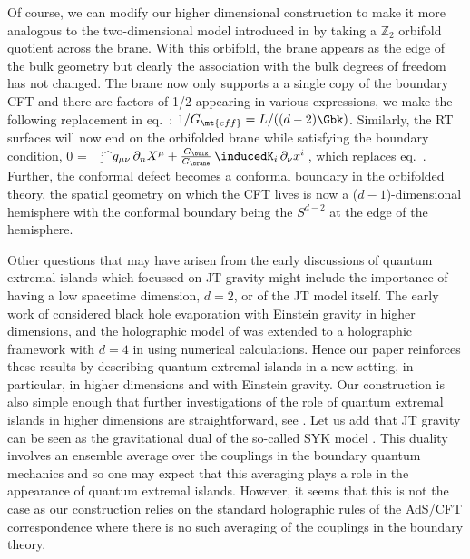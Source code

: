 Of course, we can modify our higher dimensional construction to make it more analogous to the two-dimensional model introduced in \cite{Almheiri:2019hni} by taking a $\mathbb Z_2$ orbifold quotient across the brane. With this orbifold, the brane appears as the edge of the bulk geometry but clearly the association with the bulk degrees of freedom has not changed. The brane now only supports a a single copy of the boundary CFT and there are factors of 1/2 appearing in various expressions, \eg we make the following replacement in eq.~: ${1}/{G_\mt{eff}}=L/((d-2)\Gbk)$. Similarly, the RT surfaces will now end on the orbifolded brane while satisfying the boundary condition,
\beq\label{ortho8}
 0  =  \tg_j{}^\nu\(g_{\mu\nu}\,\partial_{n}X^\mu
  + \frac{G_\bulk}{G_\brane}\,\inducedK_i \,\partial_\nu x^i\)\,,
\eeq
which replaces eq.~. Further, the conformal defect becomes a conformal boundary in the orbifolded theory, \ie the spatial geometry on which the CFT lives is now a ($d-1$)-dimensional hemisphere with the conformal boundary being the $S^{d-2}$ at the edge of the hemisphere. 

Other questions that may have arisen from the early discussions of quantum extremal islands which focussed on JT gravity might include the importance of having a low spacetime dimension, \ie $d=2$, or of the JT model itself. The early work of \cite{Penington:2019npb} considered black hole evaporation with Einstein gravity in higher dimensions, and the holographic model of \cite{Almheiri:2019hni} was extended to a holographic framework with $d=4$ in \cite{Almheiri:2019psy} using numerical calculations. Hence our paper reinforces these results by describing quantum extremal islands in a new setting, in particular, in higher dimensions and with Einstein gravity. Our construction is also simple enough that further investigations of the role of quantum extremal islands in higher dimensions are straightforward, \eg see \cite{QEI}. Let us add that JT gravity can be seen as the gravitational dual of the so-called SYK model \cite{Maldacena:2016hyu,Sachdev:1992fk,Sachdev:2010um,Ktalks}. This duality involves an ensemble average over the couplings in the boundary quantum mechanics and so one may expect that this averaging plays a role in the appearance of quantum extremal islands. However, it seems that this is not the case as our construction relies on the standard holographic rules of the AdS/CFT correspondence where there is no such averaging of the couplings in the boundary theory.


